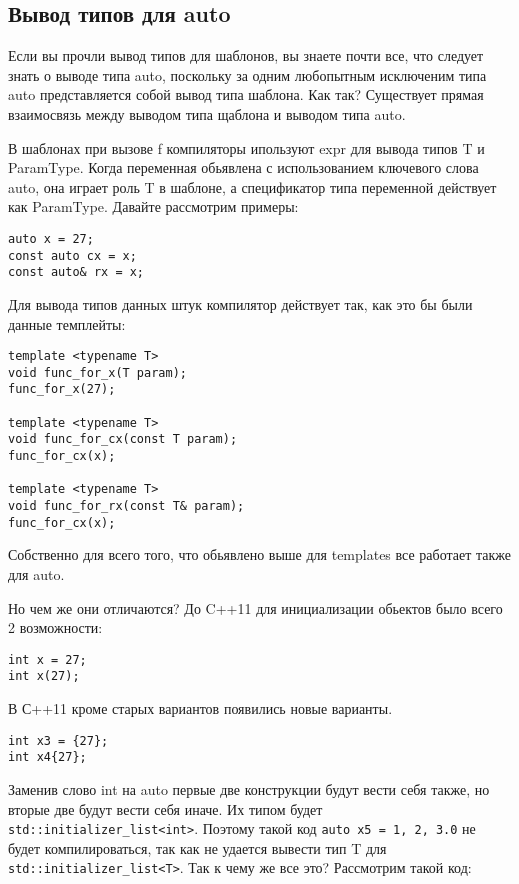 	\subsection{Вывод типов для auto}
	Если вы прочли вывод типов для шаблонов, вы знаете почти все, что следует знать о выводе типа auto, поскольку за одним любопытным исключеним типа auto представляется собой вывод типа шаблона. Как так? Существует прямая взаимосвязь между выводом типа щаблона и выводом типа auto.
	
	В шаблонах при вызове f компиляторы ипользуют expr для вывода типов T и ParamType. Когда переменная обьявлена с использованием ключевого слова auto, она играет роль T в шаблоне, а спецификатор типа переменной действует как ParamType.
	Давайте рассмотрим примеры:
\begin{verbatim}
auto x = 27;
const auto cx = x;
const auto& rx = x;
\end{verbatim}

	Для вывода типов данных штук компилятор действует так, как это бы были данные темплейты:
	
\begin{verbatim}
template <typename T>
void func_for_x(T param);
func_for_x(27);

template <typename T>
void func_for_cx(const T param);
func_for_cx(x);

template <typename T>
void func_for_rx(const T& param);
func_for_cx(x);
\end{verbatim}

	Собственно для всего того, что обьявлено выше для templates все работает также для auto.
	
	Но чем же они отличаются? До C++11 для инициализации обьектов было всего 2 возможности:
\begin{verbatim}
int x = 27;
int x(27);
\end{verbatim}
	В С++11 кроме старых вариантов появились новые варианты.
	
\begin{verbatim}
int x3 = {27};
int x4{27};
\end{verbatim}
	
	Заменив слово int на auto первые две конструкции будут вести себя также, но вторые две будут вести себя иначе. Их типом будет \texttt{std::initializer_list<int>}. Поэтому такой код \texttt{auto x5 = {1, 2, 3.0}} не будет компилироваться, так как не удается вывести тип T для \texttt{std::initializer_list<T>}. Так к чему же все это? Рассмотрим такой код:
	
